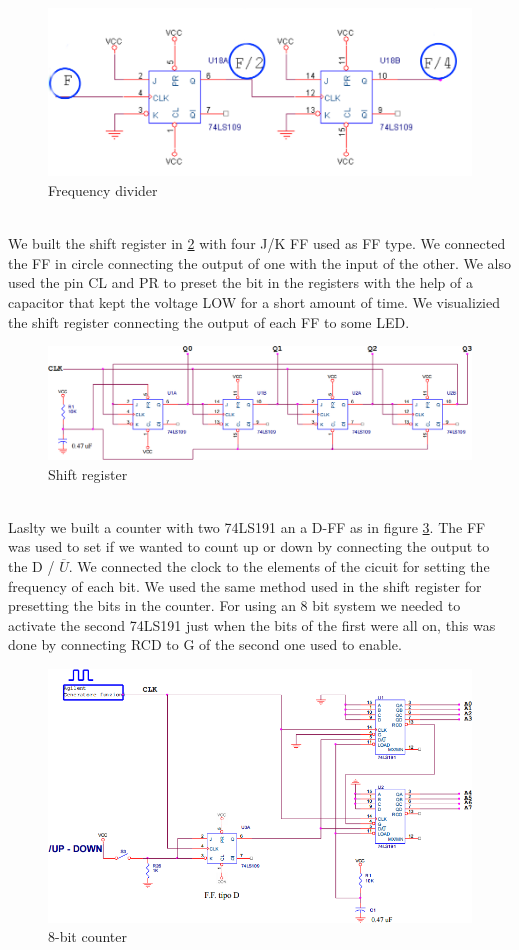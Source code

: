 \begin{figure}[H]
\centering
\includegraphics[width=.7\textwidth]{11/f_div.png}
\caption{Frequency divider}\label{f_div}
\end{figure}\\
We built the shift register in \ref{shift_reg} with four J/K FF used as FF type. We connected the FF in circle connecting the output of one with the input of the other. We also used the pin CL and PR to preset the bit in the registers with the help of a capacitor that kept the voltage LOW for a short amount of time. We visualizied the shift register connecting the output of each FF to some LED.
\begin{figure}[H]
\centering
\includegraphics[width=.7\textwidth]{11/shift_reg.png}
\caption{Shift register}\label{shift_reg}

\end{figure}\\
Laslty we built a counter with two 74LS191 an a D-FF as in figure \ref{count}. The FF was  used to set if we wanted to count up or down by connecting the output to the D / $\overline{U}$. We connected the clock to the elements of the cicuit for  setting the frequency of each bit. We used the same method used in the shift register for presetting the bits in the counter. For using an 8 bit system we needed to activate the second 74LS191 just when the bits of the first were all on, this was done by connecting RCD to G of the second one used to enable.
\begin{figure}[H]
\centering
\includegraphics[width=.7\textwidth]{11/count.png}
\caption{8-bit counter}\label{count}
\end{figure}
